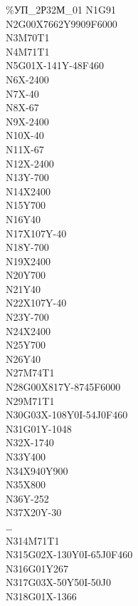 \begin{figure}
  \begin{multicols}{3}
    \%УП\_2Р32М\_01
    N1G91 \\
    N2G00X7662Y9909F6000 \\
    N3M70T1 \\
    N4M71T1 \\
    N5G01X-141Y-48F460 \\
    N6X-2400  \\
    N7X-40  \\
    N8X-67  \\
    N9X-2400  \\
    N10X-40 \\
    N11X-67 \\
    N12X-2400 \\
    N13Y-700  \\
    N14X2400  \\
    N15Y700 \\
    N16Y40  \\
    N17X107Y-40 \\
    N18Y-700  \\
    N19X2400  \\
    N20Y700 \\
    N21Y40  \\
    N22X107Y-40 \\
    N23Y-700  \\
    N24X2400  \\
    N25Y700 \\
    N26Y40  \\
    N27M74T1  \\
    N28G00X817Y-8745F6000 \\
    N29M71T1  \\
    N30G03X-108Y0I-54J0F460 \\
    N31G01Y-1048  \\
    N32X-1740 \\
    N33Y400 \\
    N34X940Y900 \\
    N35X800 \\
    N36Y-252  \\
    N37X20Y-30  \\
    … \\
    N314M71T1 \\
    N315G02X-130Y0I-65J0F460  \\
    N316G01Y267 \\
    N317G03X-50Y50I-50J0  \\
    N318G01X-1366 \\

\end{multicols}
\end{figure}
